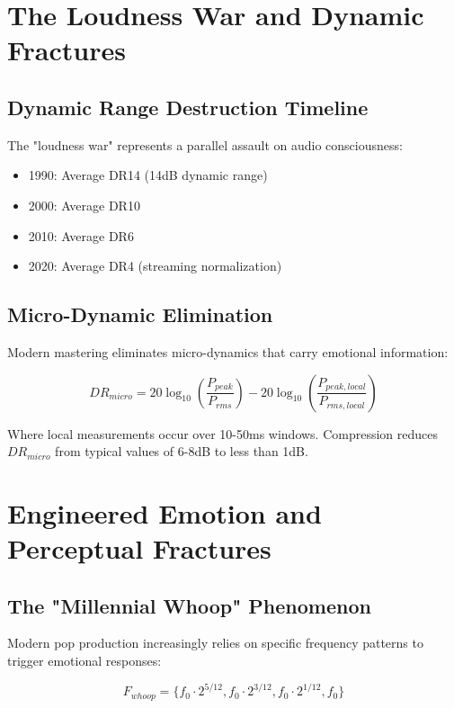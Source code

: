 \documentclass[12pt,a4paper]{article}
\begin{document}
\section{The Loudness War and Dynamic Fractures}

\subsection{Dynamic Range Destruction Timeline}

The "loudness war" represents a parallel assault on audio consciousness:

\begin{itemize}
\item 1990: Average DR14 (14dB dynamic range)
\item 2000: Average DR10
\item 2010: Average DR6
\item 2020: Average DR4 (streaming normalization)
\end{itemize}

\subsection{Micro-Dynamic Elimination}

Modern mastering eliminates micro-dynamics that carry emotional information:

\begin{equation}
DR_{micro} = 20\log_{10}\left(\frac{P_{peak}}{P_{rms}}\right) - 20\log_{10}\left(\frac{P_{peak,local}}{P_{rms,local}}\right)
\end{equation}

Where local measurements occur over 10-50ms windows. Compression reduces $DR_{micro}$ from typical values of 6-8dB to less than 1dB.

\section{Engineered Emotion and Perceptual Fractures}

\subsection{The "Millennial Whoop" Phenomenon}

Modern pop production increasingly relies on specific frequency patterns to trigger emotional responses:

\begin{equation}
F_{whoop} = \{f_0 \cdot 2^{5/12}, f_0 \cdot 2^{3/12}, f_0 \cdot 2^{1/12}, f_0\}
\end{equation}
\end{document}
